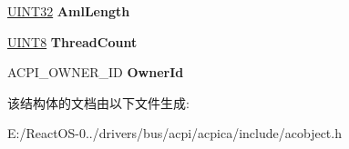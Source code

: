\begin{DoxyCompactItemize}
\begin{tabbing}
\end{tabbing}\item 
\mbox{\label{structacpi__object__method_aed53a6b3e1bce2f64c448df1e2514c1e}} 
\hyperlink{_processor_bind_8h_ae1e6edbbc26d6fbc71a90190d0266018}{U\+I\+N\+T32} {\bfseries Aml\+Length}
\item 
\mbox{\label{structacpi__object__method_ae8bd3e107fc452a44109fadaae0ac55b}} 
\hyperlink{_processor_bind_8h_ab27e9918b538ce9d8ca692479b375b6a}{U\+I\+N\+T8} {\bfseries Thread\+Count}
\item 
\mbox{\label{structacpi__object__method_a262b9f3aeb910afea4210ea710c6989e}} 
A\+C\+P\+I\+\_\+\+O\+W\+N\+E\+R\+\_\+\+ID {\bfseries Owner\+Id}
\end{DoxyCompactItemize}


该结构体的文档由以下文件生成\+:\begin{DoxyCompactItemize}
\item 
E\+:/\+React\+O\+S-\/0../drivers/bus/acpi/acpica/include/acobject.\+h\end{DoxyCompactItemize}
